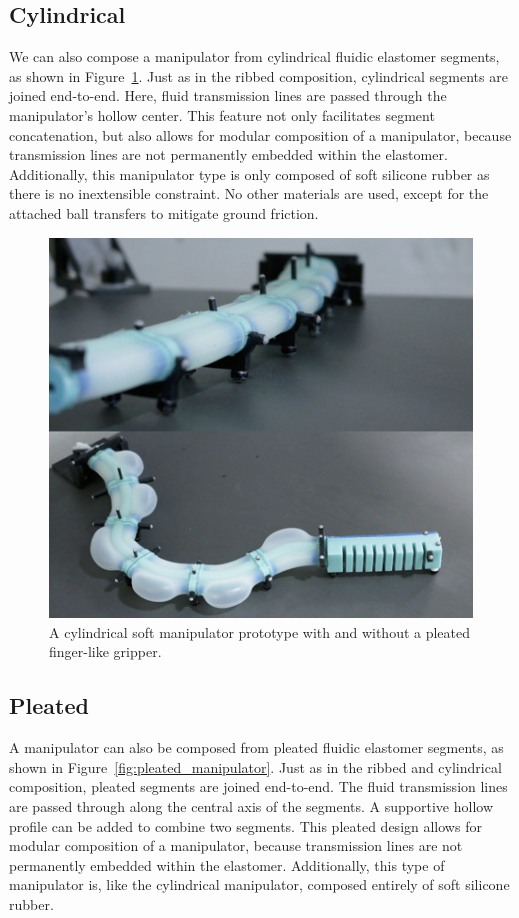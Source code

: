 \subsection{Cylindrical}
\label{subsec:Manipulators, Cylindrical}
We can also compose a manipulator from cylindrical fluidic elastomer segments, as shown in Figure~\ref{fig:cylindrical_manipulator}.
Just as in the ribbed composition, cylindrical segments are joined end-to-end.
Here, fluid transmission lines are passed through the manipulator's hollow center.
This feature not only facilitates segment concatenation, but also allows for modular composition of a manipulator, because transmission lines are not permanently embedded within the elastomer.
Additionally, this manipulator type is only composed of soft silicone rubber as there is no inextensible constraint.
No other materials are used, except for the attached ball transfers to mitigate ground friction.
\begin{figure}[htb]
\centering
\includegraphics[width=\columnwidth]{Figures/manipulators/cylindrical_manipulator_real}
\caption[A cylindrical soft manipulator prototype.]{A cylindrical soft manipulator prototype with and without a pleated finger-like gripper.} \label{fig:cylindrical_manipulator}
\end{figure}

\subsection{Pleated}
\label{subsec:Manipulators, Pleated}
A manipulator can also be composed from pleated fluidic elastomer segments, as shown in Figure~\ref{fig:pleated_manipulator}.
Just as in the ribbed and cylindrical composition, pleated segments are joined end-to-end.
The fluid transmission lines are passed through along the central axis of the segments.
A supportive hollow profile can be added to combine two segments.
This pleated design allows for modular composition of a manipulator, because transmission lines are not permanently embedded within the elastomer.
Additionally, this type of manipulator is, like the cylindrical manipulator, composed entirely of soft silicone rubber.

